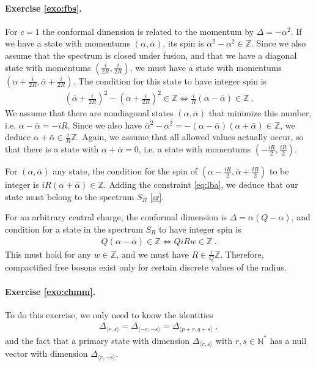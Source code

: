 \documentclass[12pt, a4paper]{article}
\theoremstyle{break}
\begin{document}
\paragraph{Exercise \ref{exo:fbs}.}

For $c=1$ the conformal dimension is related to the momentum by $\Delta = -\alpha^2$. If we have a state with momentums $(\alpha,\bar\alpha)$, its spin is $\bar\alpha^2-\alpha^2\in\mathbb{Z}$. Since we also assume that the spectrum is closed under fusion, and that we have a diagonal state with momentums $(\frac{i}{2R},\frac{i}{2R})$, we must have a state with momentums $(\alpha +\frac{i}{2R},\bar \alpha+\frac{i}{2R})$. The condition for this state to have integer spin is 
\begin{align}
 \left(\bar \alpha +\tfrac{i}{2R}\right)^2 - \left(\alpha +\tfrac{i}{2R}\right)^2 \in \mathbb{Z} \iff \frac{i}{R}(\alpha -\bar \alpha)\in\mathbb{Z}\ .
 \label{eq:lba}
\end{align}
We assume that there are nondiagonal states $(\alpha,\bar\alpha)$ that minimize this number, i.e. $\alpha-\bar\alpha = -iR$.
Since we also have $\bar\alpha^2-\alpha^2 = -(\alpha-\bar \alpha)(\alpha+\bar \alpha)\in\mathbb{Z}$, we deduce $\alpha+\bar\alpha\in \frac{i}{R}\mathbb{Z}$. Again, we assume that all allowed values actually occur, so that there is a state with $\alpha+\bar\alpha = 0$, i.e. a state with momentums $(-\frac{iR}{2},\frac{iR}{2})$.

For $(\alpha,\bar\alpha)$ any state, the condition for the spin of $(\alpha-\frac{iR}{2},\bar\alpha +\frac{iR}{2})$ to be integer is $iR(\alpha+\bar\alpha)\in\mathbb{Z}$. Adding the constraint \eqref{eq:lba}, we deduce that our state must belong to the spectrum $S_R$ \eqref{sr}.

For an arbitrary central charge, the conformal dimension is $\Delta = \alpha(Q-\alpha)$, and condition for  a state in the spectrum $S_R$ to have integer spin is 
\begin{align}
 Q(\alpha-\bar \alpha) \in\mathbb{Z} \iff QiRw \in\mathbb{Z}\ .
\end{align}
This must hold for any $w\in\mathbb{Z}$, and we must have $R\in \frac{i}{Q}\mathbb{Z}$. Therefore, compactified free bosons exist only for certain discrete values of the radius.

\paragraph{Exercise \ref{exo:chmm}.}

To do this exercise, we only need to know the identities 
\begin{align}
 \Delta_{\langle r,s\rangle} = \Delta_{\langle -r,-s\rangle}=\Delta_{\langle p+r,q+s\rangle}\ ,
 \label{eq:deltaid}
\end{align}
and the fact that a primary state with dimension $\Delta_{\langle r,s\rangle}$ with $r,s\in\mathbb{N}^*$ has a null vector with dimension $\Delta_{\langle r,-s\rangle}$.
\end{document}
